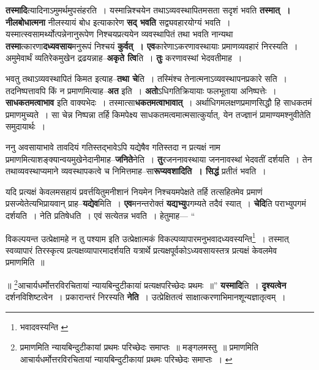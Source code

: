 \documentclass[article,12pt,a4paper]{memoir}
\begin{document}
	  \pstart \textbf{तस्मादि}त्यादिनाऽमुमर्थमुपसंहरति । यस्मान्निश्चयेन तथाऽव्यवस्थापितमसता सदृशं भवति \textbf{तस्मात् । नीलबोधात्मना} नीलस्यायं बोध इत्याकारेण \textbf{सद् भवति} सद्व्यवहारयोग्यं भवति । यस्मात्स्वसामर्थ्योत्पन्नेनानुरूपेण निश्चयप्रत्ययेन व्यवस्थापितं तथा भवति नान्यथा \textbf{तस्मा}त्कारणा\textbf{दध्यवसाय}मनुरूपं निश्चयं \textbf{कुर्वत् । एव}कारेणाऽकरणावस्थायाः प्रमाणव्यवहारं निरस्यति । अमुमेवार्थं व्यतिरेकमुखेन द्रढयन्नाह--\textbf{अकृते त्वि}ति । \textbf{तुः} करणावस्थां भेदवतीमाह ।
	\pend
      

	  \pstart भवतु तथाऽव्यवस्थापितं किमत इत्याह--\textbf{तथा चे}ति । तस्मिंश्च तेनात्मनाऽव्यवस्थापनप्रकारे सति । तदनिष्पत्तावपि किं न प्रमाणमित्याह--\textbf{अत} इति । \textbf{अतो}ऽधिगतिक्रियायाः फलभूताया अनिष्पत्तेः । \textbf{साधकतमत्वाभाव} इति वाक्यभेदः । तस्मात्सा\textbf{धकतमत्वाभावात्} । अर्थाधिगमलक्षणप्रमाणसिद्धौ हि साधकतमं प्रमाणमुच्यते । सा चेन्न निष्पन्ना तर्हि किमपेक्ष्य साधकतमत्वमात्मसात्कुर्यात्, येन तज्ज्ञानं प्रामाण्यमश्नुवीतेति समुदायार्थः ।
	\pend
      

	  \pstart ननु अवसायाभावे तावदियं गतिस्तद्भावेऽपि यद्येषैव गतिस्तदा न प्रत्यक्षं नाम प्रमाणमित्याशङ्क्यान्वयमुखेनेदानीमाह--\textbf{जनिते}नेति । \textbf{तु}रजननावस्थाया जननावस्थां भेदवतीं दर्शयति । तेन तथाव्यवस्थाप्यमाने व्यवस्थापकत्वे च निमित्तमाह--सा\textbf{रूप्यवशादिति । सिद्धं} प्रतीतं भवति ।
	\pend
      

	  \pstart यदि प्रत्यक्षं केवलमसहायं प्रवर्त्तयितुमनीशानं नियमेन निश्चयमपेक्षते तर्हि तत्सहितमेव प्रमाणं प्रसज्येतेत्यभिप्रायवान् प्राह--\textbf{यद्येव}मिति । \textbf{एव}मनन्तरोक्तं \textbf{यद्यभ्यु}पगम्यते तदैवं स्यात् । \textbf{चेदि}ति पराभ्युपगमं दर्शयति । नेति प्रतिषेधति । एवं सत्येतन्न भवति । हेतुमाह—  \leavevmode{} “
	  
	विकल्पयन्त उत्प्रेक्षामहे न तु पश्याम इति उत्प्रेक्षात्मकं विकल्पव्यापारमनुभवादध्यवस्यन्ति\footnote{भवादवस्यन्ति \cite{dp-msA} \cite{dp-msC} \cite{dp-edP} \cite{dp-edH} \cite{dp-edE} \cite{dp-edN}} । तस्मात् स्वव्यापारं तिरस्कृत्य प्रत्यक्षव्यापारमादर्शयति यत्रार्थे प्रत्यक्षपूर्वकोऽध्यवसायस्तत्र प्रत्यक्षं केवलमेव प्रमाणमिति ॥ 
	  
	॥ \footnote{प्रमाणमिति न्यायबिन्दुटीकायां प्रथमः परिच्छेदः समाप्तः ॥ मङ्गलमस्तु ॥ \cite{dp-msA} प्रमाणमिति आचार्यधर्मोत्तरविरचितायां न्यायबिन्दुटीकायां प्रथमः परिच्छेदः समाप्तः । \cite{dp-msC}}\-आचार्यधर्मोत्तरविरचितायां न्यायबिन्दुटीकायां प्रत्यक्षपरिच्छेदः प्रथमः ॥” \textbf{यस्मादि}ति । \textbf{दृश्यत्वेन} दर्शनविशिष्टत्वेन । प्रकारान्तरं निरस्यति \textbf{नेति} । उत्प्रेक्षितत्वं साक्षात्करणाभिमानशून्यज्ञातृत्वम् ।
	\pend
      
\end{document}
